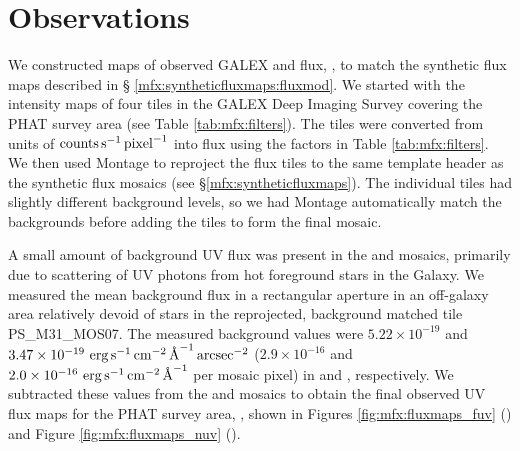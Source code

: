 \section{Observations}\label{mfx:observations}

We constructed maps of observed GALEX \fuv{} and \nuv{} flux, \fxobs{}, to
match the synthetic flux maps described in \S
\ref{mfx:syntheticfluxmaps:fluxmod}. We started with the intensity maps of four
tiles in the GALEX Deep Imaging Survey \citep[DIS][]{Martin:2005} covering the
PHAT survey area (see Table \ref{tab:mfx:filters}). The tiles were converted
from units of $\mathrm{counts} \,\mathrm{s}^{-1} \,\mathrm{pixel}^{-1}$ into flux
using the factors in Table \ref{tab:mfx:filters}. We then used Montage to
reproject the flux tiles to the same template header as the synthetic flux
mosaics (see \S \ref{mfx:syntheticfluxmaps}). The individual tiles had slightly
different background levels, so we had Montage automatically match the
backgrounds before adding the tiles to form the final mosaic.

A small amount of background UV flux was present in the \fuv{} and \nuv{}
mosaics, primarily due to scattering of UV photons from hot foreground stars in
the Galaxy. We measured the mean background flux in a rectangular aperture in
an off-galaxy area relatively devoid of stars in the reprojected, background
matched tile PS\_M31\_MOS07. The measured background values were $5.22 \times
10^{-19}$ and $3.47 \times 10^{-19}\, \,\mathrm{erg}\,\mathrm{s}^{-1}\,\mathrm{cm}^{-2}\,\textrm{\AA}^{-1}\,\mathrm{arcsec}^{-2}$ ($2.9 \times
10^{-16}$ and $2.0 \times 10^{-16}\, \,\mathrm{erg}\,\mathrm{s}^{-1}\,\mathrm{cm}^{-2}\,\textrm{\AA}^{-1}$ per mosaic pixel) in \fuv{} and
\nuv{}, respectively. We subtracted these values from the \fuv{} and \nuv{}
mosaics to obtain the final observed UV flux maps for the PHAT survey area,
\fxobs{}, shown in Figures \ref{fig:mfx:fluxmaps_fuv} (\fuv{}) and Figure
\ref{fig:mfx:fluxmaps_nuv} (\nuv{}).


